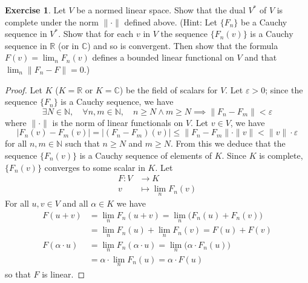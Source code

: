 \documentclass[11pt,a4paper,twoside]{article}
\theoremstyle{definition}
\newcounter{excounter}
\newtheorem{exercise}[excounter]{Exercise}
\begin{document}
\begin{exercise}

  Let $V$ be a normed linear space. Show that the dual $V^*$ of $V$ is complete under the norm $\| \cdot \|$
  defined above. (Hint: Let $\{ F_n \}$ be a Cauchy sequence in $V^*$. Show that for each $v$ in $V$ the sequence
  $\{ F_n ( v ) \}$ is a Cauchy sequence in $\mathbb{R}$ (or in $\mathbb{C}$) and so is convergent. Then show that
  the formula $F ( v ) = \lim_n F_n ( v )$ defines a bounded linear functional on $V$ and that $\lim_n \| F_n - F \| = 0$.)

\end{exercise}

\begin{proof}

  Let $K$ ($K = \mathbb{R}$ or $K = \mathbb{C}$) be the field of scalars for $V$. Let $\varepsilon > 0$;
  since the sequence $\{ F_n \}$ is a Cauchy sequence, we have
  \begin{equation*}
    \exists N \in \mathbb{N}, \quad \forall n, m \in \mathbb{N}, \quad n \geq N \land m \geq N \implies \| F_n - F_m \| < \varepsilon
  \end{equation*}
  where $\| \cdot \|$ is the norm of linear functionals on $V$. Let $v \in V$, we have
  \begin{equation}\label{ineq:cauchy_v}
    | F_n ( v ) - F_m ( v ) | = | ( F_n - F_m ) ( v ) | \leq \| F_n - F_m \| \cdot \| v \| < \| v \| \cdot \varepsilon
  \end{equation}
  for all $n, m \in \mathbb{N}$ such that $n \geq N$ and $m \geq N$. From this we deduce that the sequence $\{ F_n ( v ) \}$ is
  a Cauchy sequence of elements of $K$. Since $K$ is complete, $\{ F_n ( v ) \}$ converges to some scalar in $K$.
  Let
  \begin{align*}
    F : V &\to K \\
    v &\mapsto \lim_n F_n ( v )
  \end{align*}
  For all $u, v \in V$ and all $\alpha \in K$ we have
  \begin{align*}
    F ( u + v ) &= \lim_n F_n ( u + v ) = \lim_n \big( F_n ( u ) + F_n ( v ) \big) \\
    &= \lim_n F_n ( u ) + \lim_n F_n ( v ) = F ( u ) + F ( v ) \\
    F ( \alpha \cdot u ) &= \lim_n F_n ( \alpha \cdot u ) = \lim_n \big( \alpha \cdot F_n ( u ) \big) \\
    &= \alpha \cdot \lim_n F_n ( u ) = \alpha \cdot F ( u )
  \end{align*}
  so that $F$ is linear.


\end{proof}
\end{document}

